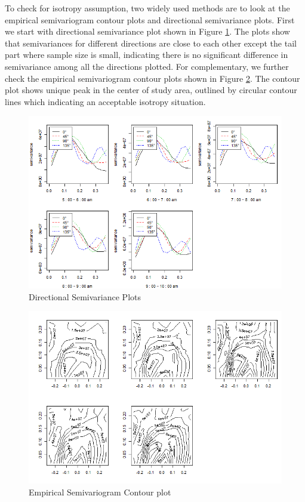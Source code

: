 \documentclass[hidelinks,12pt]{article}
\begin{document}
	To check for isotropy assumption, two widely used methods are to look at the empirical semivariogram contour plots and directional semivariance plots. First we start with directional semivariance plot shown in Figure \ref{fig:dir_semi}. The plots show that semivariances for different directions are close to each other except the tail part where sample size is small, indicating there is no significant difference in semivariance among all the directions plotted. For complementary, we further check the empirical semivariogram contour plots shown in Figure \ref{fig:esc}. The contour plot shows unique peak in the center of study area, outlined by circular contour lines which indicating an acceptable isotropy situation.
	
	\begin{figure}[!ht]
		\includegraphics[width=\textwidth]{dir_semi.png}
		\caption{Directional Semivariance Plots\label{fig:dir_semi}}
	\end{figure}
	\FloatBarrier
	
	\begin{figure}[!ht]
		\includegraphics[width=\textwidth]{esc.png}
		\caption{Empirical Semivariogram Contour plot\label{fig:esc}}
	\end{figure}
	\FloatBarrier
	
\end{document}
